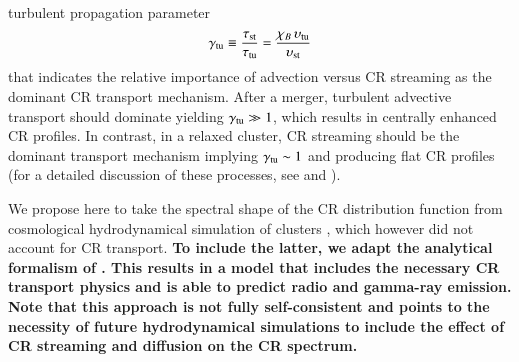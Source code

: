 \documentclass[useAMS,usenatbib]{mn2e}
\newcommand{\vel}{\upsilon}
\begin{document}
turbulent propagation parameter
\begin{equation}
  \label{eq:gamma_tu}
  \gamma_{\rmn{tu}}\equiv\frac{\tau_{\rmn{st}}}{\tau_{\rmn{tu}}}=
  \frac{\chi_B\,\vel_{\rmn{tu}}}{\vel_{\rmn{st}}}
\end{equation}
that indicates the relative importance of advection versus CR streaming as the
dominant CR transport mechanism. After a merger, turbulent advective transport
should dominate yielding $\gamma_{{\mathrm{tu}}}\gg 1$, which results in centrally enhanced
CR profiles. In contrast, in a relaxed cluster, CR streaming should be the
dominant transport mechanism implying $\gamma_{{\mathrm{tu}}}\sim1$ and producing
flat CR profiles (for a detailed discussion of these processes, see
\citealp{2011A&A...527A..99E} and \citealp{2013arXiv1303.4746W}).

We propose here to take the spectral shape of the CR distribution function from
cosmological hydrodynamical simulation of clusters \citep{2010MNRAS.409..449P},
which however did not account for CR transport. {\bf To include the latter, we
  adapt the analytical formalism of \citet{2011A&A...527A..99E}. This results in
  a model that includes the necessary CR transport physics and is able to
  predict radio and gamma-ray emission. Note that this approach is not fully
  self-consistent and points to the necessity of future hydrodynamical
  simulations to include the effect of CR streaming and diffusion on the CR
  spectrum.}
\end{document}
